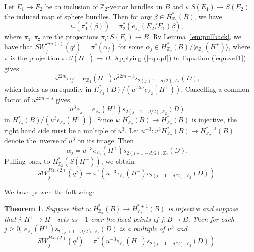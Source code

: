 \documentclass{amsart}
\newtheorem{theorem}{Theorem}[section]
\theoremstyle{definition}
\theoremstyle{remark}
\numberwithin{equation}{section}
\begin{document}
Let $E_1 \to E_2$ be an inclusion of $\mathbb{Z}_2$-vector bundles on $B$ and $\iota : S(E_1) \to S(E_2)$ the induced map of sphere bundles. Then for any $\beta \in H^*_{\mathbb{Z}_2}(B)$, we have
\begin{equation}\label{equ:pf}
\iota_*( \pi_1^*(\beta) ) = \pi_2^*( e_{\mathbb{Z}_2}(E_2/E_1) \beta),
\end{equation}
where $\pi_1,\pi_2$ are the projections $\pi_i : S(E_i) \to B$. By Lemma \ref{lem:pullback}, we have that $SW^{Pin(2)}_{\widehat{f}}(q^j) = \pi^*( \alpha_j)$ for some $\alpha_j \in H^*_{\mathbb{Z}_2}(B)/\langle e_{\mathbb{Z}_2}(H^+) \rangle$, where $\pi$ is the projection $\pi : S(H^+) \to B$. Applying (\ref{equ:pf}) to Equation (\ref{equ:swf1}) gives:
\[
u^{22m} \alpha_j = e_{\mathbb{Z}_2}(H^+) u^{22m-3} s_{2(j+1 - d/2),\mathbb{Z}_2}(D),
\]
which holds as an equality in $H^*_{\mathbb{Z}_2}(B)/ (u^{22m} e_{\mathbb{Z}_2}(H^+) )$. Cancelling a common factor of $u^{22m-3}$ gives
\[
u^3 \alpha_j = e_{\mathbb{Z}_2}(H^+) s_{2(j+1-d/2),\mathbb{Z}_2}(D)
\]
in $H^*_{\mathbb{Z}_2}(B)/( u^3 e_{\mathbb{Z}_2}(H^+) )$. Since $u : H^*_{\mathbb{Z}_2}(B) \to H^*_{\mathbb{Z}_2}(B)$ is injective, the right hand side must be a multiple of $u^3$. Let $u^{-3} : u^3 H^*_{\mathbb{Z}_2}(B) \to H^{*-3}_{\mathbb{Z}_2}(B)$ denote the inverse of $u^3$ on its image. Then
\[
\alpha_j = u^{-3} e_{\mathbb{Z}_2}(H^+) s_{2(j+1-d/2),\mathbb{Z}_2}(D).
\]
Pulling back to $H^*_{\mathbb{Z}_2}( S(H^+) )$, we obtain
\[
SW^{Pin(2)}_{\widehat{f}}( q^j ) = \pi^*( u^{-3} e_{\mathbb{Z}_2}(H^+) s_{2(j+1-d/2),\mathbb{Z}_2}(D) ).
\]


We have proven the following:

\begin{theorem}\label{thm:swpingen}
Suppose that $u : H^*_{\mathbb{Z}_2}(B) \to H^{*+1}_{\mathbb{Z}_2}(B)$ is injective and suppose that $j : H^+ \to H^+$ acts as $-1$ over the fixed points of $j : B \to B$. Then for each $j \ge 0$, $e_{\mathbb{Z}_2}(H^+) s_{2(j+1 -d/2),\mathbb{Z}_2}(D)$ is a multiple of $u^3$ and
\[
SW^{Pin(2)}_{\widehat{f}}( q^j ) = \pi^*( u^{-3} e_{\mathbb{Z}_2}(H^+) s_{2(j+1-d/2),\mathbb{Z}_2}(D) ).
\]
\end{theorem}
\end{document}
